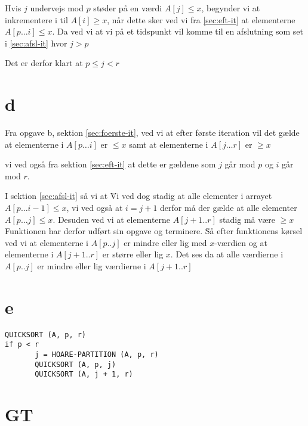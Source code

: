 \documentclass[10pt,a4paper,danish]{article}
\begin{document}
Hvis $j$ undervejs mod $p$ støder på en værdi $A[j] \leq x$, begynder vi at inkrementere i til $A[i] \geq x$, når dette sker ved vi fra \ref{sec:eft-it} at elementerne $A[p \ldots i] \leq x$. Da ved vi at vi på et tidspunkt vil komme til en afslutning som set i \ref{sec:afsl-it} hvor $j > p$

Det er derfor klart at $p \leq j < r$

\section{d}

Fra opgave b, sektion \ref{sec:foerste-it}, ved vi at efter første iteration vil det gælde at elementerne i $A[p \ldots i]$ er $\leq x$ samt at elementerne i $A[j \ldots r]$ er $\geq x$

vi ved også fra sektion \ref{sec:eft-it} at dette er gældene som $j$ går mod $p$ og $i$ går mod $r$.

I sektion \ref{sec:afsl-it} så vi at \" Vi ved dog stadig at alle elementer i arrayet $A[p \ldots i-1] \leq x$, vi ved også at $i = j+1$ derfor må der gælde at alle elementer $A[p \ldots j] \leq x$. Desuden ved vi at elementerne $A[j+1..r]$ stadig må være $\geq x$
Funktionen har derfor udført sin opgave og terminere. \"
Så efter funktionens kørsel ved vi at elementerne i $A[p..j]$ er mindre eller lig med $x$-værdien og at elementerne i $A[j+1..r]$ er større eller lig $x$. Det ses da at alle værdierne i $A[p..j]$ er mindre eller lig værdierne i $A[j+1..r]$

\section{e}
\begin{verbatim}
QUICKSORT (A, p, r)
if p < r
       j = HOARE-PARTITION (A, p, r)
       QUICKSORT (A, p, j)
       QUICKSORT (A, j + 1, r)
\end{verbatim}

\section{GT}
\end{document}
